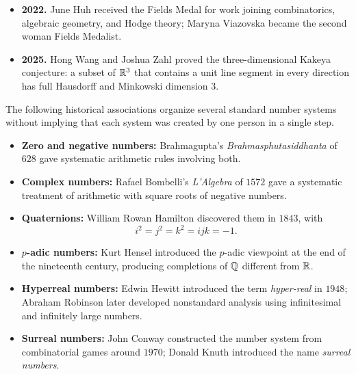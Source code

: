 \begin{itemize}
              $E_8$ lattice sphere packing in dimension $8$; joint work soon
              settled dimension $24$ using the Leech lattice.
        \item \textbf{2022.} June Huh received the Fields Medal for work joining
              combinatorics, algebraic geometry, and Hodge theory; Maryna
              Viazovska became the second woman Fields Medalist.
        \item \textbf{2025.} Hong Wang and Joshua Zahl proved the
              three-dimensional Kakeya conjecture: a subset of $\mathbb{R}^3$ that
              contains a unit line segment in every direction has full
              Hausdorff and Minkowski dimension $3$.
    \end{itemize}


    \begin{fact}
        The following historical associations organize several standard number
        systems without implying that each system was created by one person in
        a single step.
        \begin{itemize}
            \item \textbf{Zero and negative numbers:} Brahmagupta's
                  \textit{Brahmasphutasiddhanta} of $628$ gave systematic
                  arithmetic rules involving both.
            \item \textbf{Complex numbers:} Rafael Bombelli's
                  \textit{L'Algebra} of $1572$ gave a systematic treatment of
                  arithmetic with square roots of negative numbers.
            \item \textbf{Quaternions:} William Rowan Hamilton discovered them
                  in $1843$, with
                  \[
                      i^2=j^2=k^2=ijk=-1.
                  \]
            \item \textbf{$p$-adic numbers:} Kurt Hensel introduced the
                  $p$-adic viewpoint at the end of the nineteenth century,
                  producing completions of $\mathbb{Q}$ different from $\mathbb{R}$.
            \item \textbf{Hyperreal numbers:} Edwin Hewitt introduced the term
                  \emph{hyper-real} in $1948$; Abraham Robinson later developed
                  nonstandard analysis using infinitesimal and infinitely large
                  numbers.
            \item \textbf{Surreal numbers:} John Conway constructed the number
                  system from combinatorial games around $1970$; Donald Knuth
                  introduced the name \emph{surreal numbers}.
        \end{itemize}
    \end{fact}

